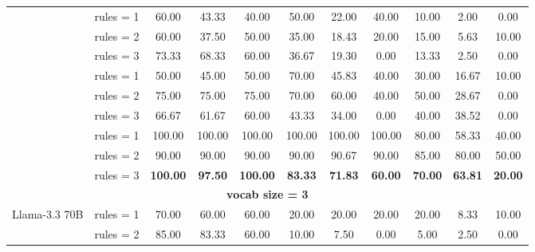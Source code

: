 \begin{table*}[t]
{\begin{tabular}{l c ccc ccc ccc}
           \hdashline
           \multirow{3}{*}{GPT-4o} & rules = 1 & 60.00 & 43.33 & 40.00 & 50.00 & 22.00 & 40.00 & 10.00 & 2.00 & 0.00 \\
           & rules = 2 & 60.00 & 37.50 & 50.00 & 35.00 & 18.43 & 20.00 & 15.00 & 5.63 & 10.00 \\
           & \cellcolor{SeaGreen3!15}rules = 3 & \cellcolor{SeaGreen3!15}73.33 & \cellcolor{SeaGreen3!15}68.33 & \cellcolor{SeaGreen3!15}60.00 & \cellcolor{SeaGreen3!15}36.67 & \cellcolor{SeaGreen3!15}19.30 & \cellcolor{SeaGreen3!15}0.00 & \cellcolor{SeaGreen3!15}13.33 & \cellcolor{SeaGreen3!15}2.50 & \cellcolor{SeaGreen3!15}0.00\\
           \hdashline
           \multirow{3}{*}{o1-mini} & rules = 1 & 50.00 & 45.00 & 50.00 & 70.00 & 45.83 & 40.00 & 30.00 & 16.67 & 10.00 \\
           & rules = 2 & 75.00 & 75.00 & 75.00 & 70.00 & 60.00 & 40.00 & 50.00 & 28.67 & 0.00\\
           & \cellcolor{SeaGreen3!15}rules = 3 & \cellcolor{SeaGreen3!15}66.67 & \cellcolor{SeaGreen3!15}61.67 & \cellcolor{SeaGreen3!15}60.00 & \cellcolor{SeaGreen3!15}43.33 & \cellcolor{SeaGreen3!15}34.00 & \cellcolor{SeaGreen3!15}0.00 & \cellcolor{SeaGreen3!15}40.00 & \cellcolor{SeaGreen3!15}38.52 & \cellcolor{SeaGreen3!15}0.00\\
           \hdashline
           \multirow{3}{*}{o3-mini} & rules = 1 & 100.00 & 100.00 & 100.00 & 100.00 & 100.00 & 100.00 & 80.00 & 58.33 & 40.00\\
           & rules = 2 & 90.00 & 90.00 & 90.00 & 90.00 & 90.67 & 90.00 & 85.00 & 80.00 & 50.00\\
           & \cellcolor{SeaGreen3!15}rules = 3 & \cellcolor{SeaGreen3!15}\textbf{100.00} & \cellcolor{SeaGreen3!15}\textbf{97.50} & \cellcolor{SeaGreen3!15}\textbf{100.00} & \cellcolor{SeaGreen3!15}\textbf{83.33} & \cellcolor{SeaGreen3!15}\textbf{71.83} & \cellcolor{SeaGreen3!15}\textbf{60.00} & \cellcolor{SeaGreen3!15}\textbf{70.00} & \cellcolor{SeaGreen3!15}\textbf{63.81} & \cellcolor{SeaGreen3!15}\textbf{20.00}\\
           \midrule 
           \multicolumn{11}{c}{\textbf{vocab size = 3}} \\
         \midrule
           \multirow{3}{*}{Llama-3.3 70B} & rules = 1 & 70.00 & 60.00 & 60.00 & 20.00 & 20.00 & 20.00 & 20.00 & 8.33 & 10.00\\
           & rules = 2 & 85.00 & 83.33 & 60.00 & 10.00 & 7.50 & 0.00 & 5.00 & 2.50 & 0.00\\

\end{tabular}}
\end{table*}

